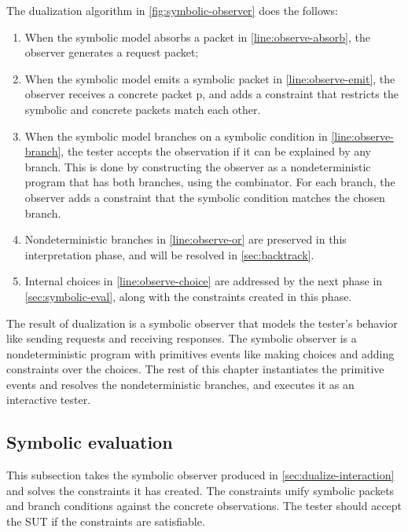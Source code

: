 The dualization algorithm in \autoref{fig:symbolic-observer} does the follows:
\begin{enumerate}
  \item When the symbolic model absorbs a packet in
    \autoref{line:observe-absorb}, the observer generates a request packet;
  \item When the symbolic model emits a symbolic packet  in
    \autoref{line:observe-emit}, the observer receives a concrete packet \ilc p,
    and adds a constraint that restricts the symbolic and concrete packets match
    each other.
  \item When the symbolic model branches on a symbolic condition  in
    \autoref{line:observe-branch}, the tester accepts the observation if it can
    be explained by any branch.  This is done by constructing the observer as a
    nondeterministic program that has both branches, using the 
    combinator.  For each branch, the observer adds a constraint that the
    symbolic condition matches the chosen branch.
  \item Nondeterministic branches in \autoref{line:observe-or} are preserved in
    this interpretation phase, and will be resolved in \autoref{sec:backtrack}.
  \item Internal choices in \autoref{line:observe-choice} are addressed by the
    next phase in \autoref{sec:symbolic-eval}, along with the constraints
    created in this phase.
\end{enumerate}

The result of dualization is a symbolic observer that models the tester's
behavior like sending requests and receiving responses.  The symbolic observer
is a nondeterministic program with primitives events like making choices and
adding constraints over the choices.  The rest of this chapter instantiates the
primitive events and resolves the nondeterministic branches, and executes it as
an interactive tester.

\subsection{Symbolic evaluation}
\label{sec:symbolic-eval}
This subsection takes the symbolic observer produced in
\autoref{sec:dualize-interaction} and solves the constraints it has created.
The constraints unify symbolic packets and branch conditions against the
concrete observations.  The tester should accept the SUT if the constraints are
satisfiable.

